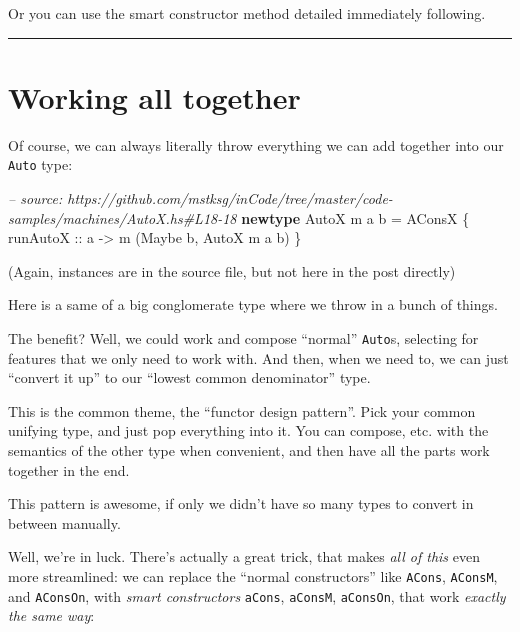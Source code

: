 \documentclass[]{article}
\newenvironment{Shaded}{}{}
\newcommand{\KeywordTok}[1]{\textcolor[rgb]{0.00,0.44,0.13}{\textbf{{#1}}}}
\newcommand{\DataTypeTok}[1]{\textcolor[rgb]{0.56,0.13,0.00}{{#1}}}
\newcommand{\CommentTok}[1]{\textcolor[rgb]{0.38,0.63,0.69}{\textit{{#1}}}}
\newcommand{\OtherTok}[1]{\textcolor[rgb]{0.00,0.44,0.13}{{#1}}}
\newcommand{\FunctionTok}[1]{\textcolor[rgb]{0.02,0.16,0.49}{{#1}}}
\newcommand{\NormalTok}[1]{{#1}}
\begin{document}
Or you can use the smart constructor method detailed immediately
following.

\begin{center}\rule{0.5\linewidth}{\linethickness}\end{center}

\section{Working all together}\label{working-all-together}

Of course, we can always literally throw everything we can add together
into our \texttt{Auto} type:

\begin{Shaded}
\begin{Highlighting}[]
\CommentTok{-- source: https://github.com/mstksg/inCode/tree/master/code-samples/machines/AutoX.hs#L18-18}
\KeywordTok{newtype} \DataTypeTok{AutoX} \NormalTok{m a b }\FunctionTok{=} \DataTypeTok{AConsX} \NormalTok{\{}\OtherTok{ runAutoX ::} \NormalTok{a }\OtherTok{->} \NormalTok{m (}\DataTypeTok{Maybe} \NormalTok{b, }\DataTypeTok{AutoX} \NormalTok{m a b) \}}
\end{Highlighting}
\end{Shaded}

(Again, instances are in the source file, but not here in the post
directly)

Here is a same of a big conglomerate type where we throw in a bunch of
things.

The benefit? Well, we could work and compose ``normal'' \texttt{Auto}s,
selecting for features that we only need to work with. And then, when we
need to, we can just ``convert it up'' to our ``lowest common
denominator'' type.

This is the common theme, the ``functor design pattern''. Pick your
common unifying type, and just pop everything into it. You can compose,
etc. with the semantics of the other type when convenient, and then have
all the parts work together in the end.

This pattern is awesome, if only we didn't have so many types to convert
in between manually.

Well, we're in luck. There's actually a great trick, that makes
\emph{all of this} even more streamlined: we can replace the ``normal
constructors'' like \texttt{ACons}, \texttt{AConsM}, and
\texttt{AConsOn}, with \emph{smart constructors} \texttt{aCons},
\texttt{aConsM}, \texttt{aConsOn}, that work \emph{exactly the same
way}:
\end{document}
